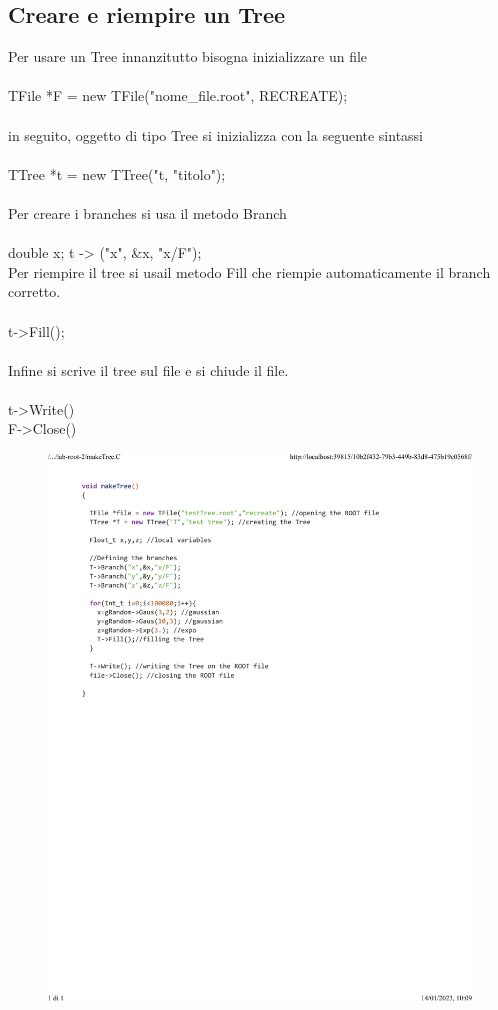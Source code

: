\documentclass[10pt,a4paper]{article}
\begin{document}
\subsection{Creare e riempire un Tree}
Per usare un Tree innanzitutto bisogna inizializzare un file\\\\
TFile *F = new TFile("nome\_file.root", RECREATE);\\\\
 in seguito, oggetto di tipo Tree si inizializza con la seguente sintassi \\\\
TTree *t = new TTree("t, "titolo");\\\\
Per creare i branches si usa il metodo Branch\\\\
double x;
t -> ("x", \&x, "x/F");\\
Per riempire il tree si usail metodo Fill che riempie automaticamente il branch corretto. \\\\
t->Fill();\\\\
Infine si scrive il tree sul file e si chiude il file.\\\\
t->Write()\\
F->Close()\\
\newpage
\begin{figure}[h!]
	\centering
	\includegraphics[width=1.\linewidth]{_..._lab-root-2_makeTree.C}
	\caption{}
	\label{fig:1}
\end{figure}
\newpage
\end{document}
